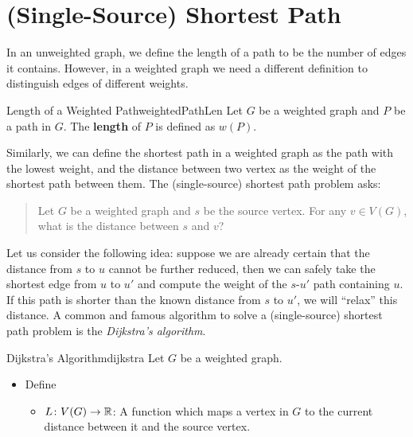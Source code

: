 \documentclass[math]{amznotes}
\theoremstyle{remark}
\begin{document}
\section{(Single-Source) Shortest Path}
In an unweighted graph, we define the length of a path to be the number of edges it contains. However, in a weighted graph we need a different definition to distinguish edges of different weights.
\begin{dfnbox}{Length of a Weighted Path}{weightedPathLen}
    Let $G$ be a weighted graph and $P$ be a path in $G$. The {\color{red} \textbf{length}} of $P$ is defined as $w(P)$.
\end{dfnbox}
Similarly, we can define the shortest path in a weighted graph as the path with the lowest weight, and the distance between two vertex as the weight of the shortest path between them. The (single-source) shortest path problem asks:
\begin{quote}
    Let $G$ be a weighted graph and $s$ be the source vertex. For any $v \in V(G)$, what is the distance between $s$ and $v$?
\end{quote}
Let us consider the following idea: suppose we are already certain that the distance from $s$ to $u$ cannot be further reduced, then we can safely take the shortest edge from $u$ to $u'$ and compute the weight of the $s$-$u'$ path containing $u$. If this path is shorter than the known distance from $s$ to $u'$, we will ``relax'' this distance. A common and famous algorithm to solve a (single-source) shortest path problem is the \textit{Dijkstra's algorithm}.
\begin{tecbox}{Dijkstra's Algorithm}{dijkstra}
    Let $G$ be a weighted graph.
    \begin{itemize}
        \item Define
        \begin{itemize}
            \item $L \colon V(G) \to \mathbb{R}$: A function which maps a vertex in $G$ to the current distance between it and the source vertex.  
        \end{itemize}
    \end{itemize} 
\end{tecbox}
\end{document}
